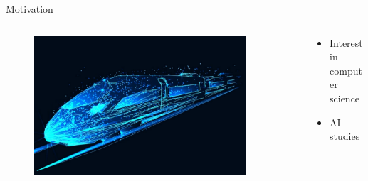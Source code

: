 \documentclass[aspectratio=169]{beamer}
\begin{document}
\begin{frame}{Motivation}
    \begin{columns}[T]
        \begin{column}{0.3\textwidth}
            \begin{figure}[H]
                \raggedleft
                \includegraphics[width=0.9\textwidth]{./tex_images/digital_train.png}
            \end{figure}
        \end{column}
        \begin{column}{0.65\textwidth}
            \vspace*{0.5cm}
            \begin{itemize}
                \item Interest in computer science
                \item AI studies
            \end{itemize}
        \end{column}
    \end{columns}
\end{frame}
\end{document}
